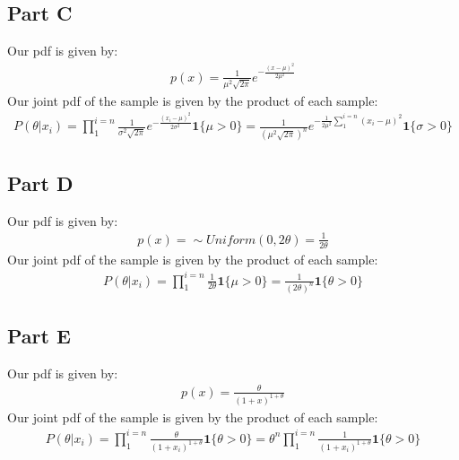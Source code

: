\documentclass{article}
\begin{document}
\subsection*{Part C}
Our pdf is given by:
\begin{align*}
p(x) = \frac{1}{\mu^2 \sqrt{2\pi}} e^{-\frac{(x-\mu)^2}{2\mu^2}}
\end{align*}
Our joint pdf of the sample is given by the product of each sample:
\begin{align*}
P(\theta|x_i) = \prod_{1}^{i=n} \frac{1}{\sigma^2 \sqrt{2\pi}} e^{-\frac{(x_i-\mu)^2}{2\sigma^2}} \mathbf{1}\{\mu > 0 \}  = \boxed{ \frac{1}{(\mu^2 \sqrt{2\pi})^n} e^{-\frac{1}{2\mu^2}\sum_{1}^{i=n} (x_i-\mu)^2} \mathbf{1}\{\sigma > 0 \}}
\end{align*}

\subsection*{Part D}
Our pdf is given by:
\begin{align*}
p(x) = \sim Uniform(0,2 \theta) = \frac{1}{2\theta}
\end{align*}
Our joint pdf of the sample is given by the product of each sample:
\begin{align*}
\boxed{ P(\theta|x_i) = \prod_{1}^{i=n} \frac{1}{2\theta} \mathbf{1}\{\mu > 0 \}  = \frac{1}{(2\theta)^n} \mathbf{1}\{\theta > 0 \} }
\end{align*}

\subsection*{Part E}
Our pdf is given by:
\begin{align*}
p(x) = \frac{\theta}{(1+x)^{1+\theta}}
\end{align*}
Our joint pdf of the sample is given by the product of each sample:
\begin{align*}
\boxed{ P(\theta|x_i) = \prod_{1}^{i=n} \frac{\theta}{(1+x_i)^{1+\theta}} \mathbf{1}\{\theta > 0 \}  = \theta^n \prod_{1}^{i=n} \frac{1}{(1+x_i)^{1+\theta}} \mathbf{1}\{\theta > 0 \} }
\end{align*}

\clearpage
\end{document}
